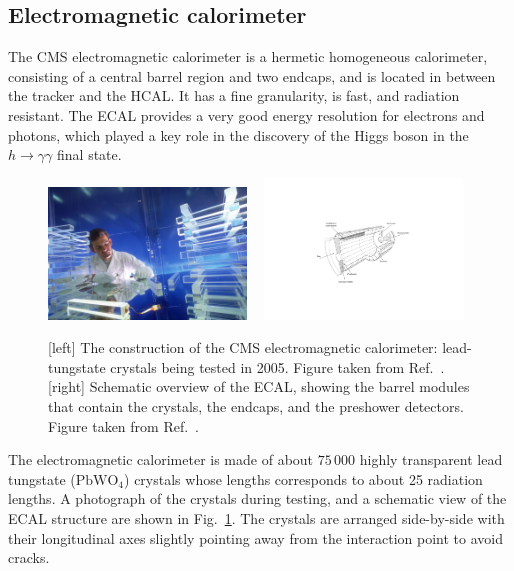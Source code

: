 \subsection{Electromagnetic calorimeter \label{sec:cms_ecal}}

The CMS electromagnetic calorimeter is a hermetic homogeneous calorimeter, consisting of a central
barrel region and two endcaps, and is located in between the tracker and the HCAL. 
It has a fine granularity, is fast, and radiation resistant.
The ECAL provides a very good energy resolution for electrons and photons, which played a key role
in the discovery of the Higgs boson in the $h\rightarrow\gamma\gamma$ final state. 

\begin{figure}[tpb]
  \centering
  \includegraphics[width=0.47\textwidth]{figures/cms/cms_ecal_crystal}
~
  \includegraphics[width=0.47\textwidth]{figures/cms/CMS_ECAL}
  \caption{[left] The construction of the CMS electromagnetic calorimeter: lead-tungstate crystals
being tested in 2005. Figure taken from Ref.~\cite{CMS_ecal_crystal}.
[right] Schematic overview of the ECAL, showing the barrel modules that contain the crystals, the
endcaps, and the preshower detectors. Figure taken from Ref.~\cite{Chatrchyan:2008aa}.
  \label{fig:cms_ecal_crystal}}
\end{figure}

The electromagnetic calorimeter is made of about $75\,000$ highly transparent lead tungstate
($\text{PbWO}_\text{4}$)
crystals whose lengths corresponds to about 25 radiation lengths. A photograph of the crystals
during testing, and a schematic view of the ECAL structure are shown in
Fig.~\ref{fig:cms_ecal_crystal}. The crystals are arranged side-by-side with their longitudinal axes
slightly pointing away from the interaction point to avoid cracks.

